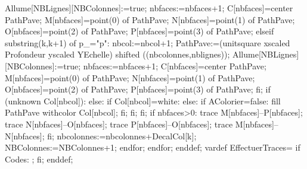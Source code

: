 {  Allume[NBLignes][NBColonnes]:=true;
  nbfaces:=nbfaces+1;
  C[nbfaces]=center PathPave;
  M[nbfaces]=point(0) of PathPave;
  N[nbfaces]=point(1) of PathPave;
  O[nbfaces]=point(2) of PathPave;
  P[nbfaces]=point(3) of PathPave;
  elseif substring(k,k+1) of p_="p":
  nbcol:=nbcol+1;
  PathPave:=(unitsquare xscaled Profondeur yscaled YEchelle) shifted ((nbcolonnes,nblignes));
  Allume[NBLignes][NBColonnes]:=true;
  nbfaces:=nbfaces+1;
  C[nbfaces]=center PathPave;
  M[nbfaces]=point(0) of PathPave;
  N[nbfaces]=point(1) of PathPave;
  O[nbfaces]=point(2) of PathPave;
  P[nbfaces]=point(3) of PathPave;
  fi;
  if (unknown Col[nbcol]):
  else:
  if Col[nbcol]=white:
  else:
  if AColorier=false:
  fill PathPave withcolor Col[nbcol];
  fi;
  fi;
  fi;
  if nbfaces>0:
  trace M[nbfaces]--P[nbfaces];
  trace N[nbfaces]--O[nbfaces];
  trace P[nbfaces]--O[nbfaces];
  trace M[nbfaces]--N[nbfaces];
  fi;
  nbcolonnes:=nbcolonnes+DecalCol[k];
  NBColonnes:=NBColonnes+1;
  endfor;
  endfor;
  enddef;
  vardef EffectuerTraces=
  if Codes:
  ;
  fi;
  enddef;
}%

